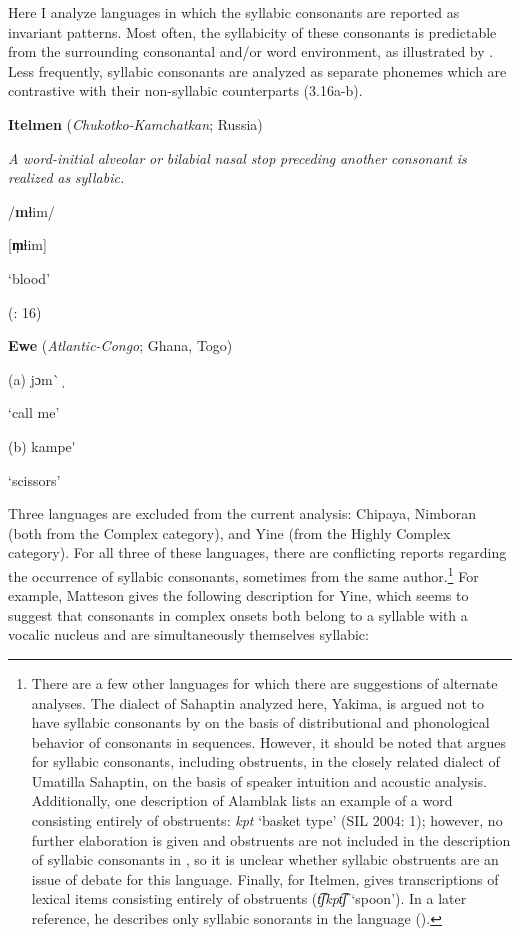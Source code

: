  Here I analyze languages in which the syllabic consonants are reported as invariant patterns. Most often, the syllabicity of these consonants is predictable from the surrounding consonantal and/or word environment, as illustrated by . Less frequently, syllabic consonants are analyzed as separate phonemes which are contrastive with their non-syllabic counterparts (3.16a-b).

\ea\label{ex:(3.15)}
  \textbf{Itelmen} (\textit{Chukotko-Kamchatkan}; Russia)

\textit{A} \textit{word-initial} \textit{alveolar} \textit{or} \textit{bilabial} \textit{nasal} \textit{stop} \textit{preceding} \textit{another} \textit{consonant} \textit{is} \textit{realized} \textit{as} \textit{syllabic.}

/\textbf{m}ɬim/

[\textbf{m̩}ɬim]

\glt ‘blood’

(\citealt{GeorgVolodin1999}: 16)
\z

\ea\label{ex:(3.16)}
  \textbf{Ewe} (\textit{Atlantic-Congo}; Ghana, Togo)

(a)   jɔm\`{} ̩

  ‘call me’

(b)  kampe\'{} 

  ‘scissors’

\citep[38]{Ameka1991}

\z

  Three languages are excluded from the current analysis: Chipaya, Nimboran (both from the Complex category), and Yine (from the Highly Complex category). For all three of these languages, there are conflicting reports regarding the occurrence of syllabic consonants, sometimes from the same author.\footnote{ \textrm{There are a few other languages for which there are suggestions of alternate analyses. The dialect of Sahaptin analyzed here, Yakima, is argued not to have syllabic consonants by \citet{HargusBeavert2006} on the basis of distributional and phonological behavior of consonants in sequences. However, it should be noted that \citet{Minthorn2005} argues for syllabic consonants, including obstruents, in the closely related dialect of Umatilla Sahaptin, on the basis of speaker intuition and acoustic analysis. Additionally, one description of Alamblak lists an example of a word consisting entirely of obstruents:} \textrm{\textit{kpt}} \textrm{‘basket type’ (SIL 2004: 1); however, no further elaboration is given and obstruents are not included in the description of syllabic consonants in \citet{Bruce1984}, so it is unclear whether syllabic obstruents are an issue of debate for this language. Finally, for Itelmen, \citet[42]{Volodin1976} gives transcriptions of lexical items consisting entirely of obstruents (}\textrm{\textit{t͡ʃkpt͡ʃ} }\textrm{‘spoon’). In a later reference, he describes only syllabic sonorants in the language (\citealt{GeorgVolodin1999}).}} For example, Matteson gives the following description for Yine, which seems to suggest that consonants in complex onsets both belong to a syllable with a vocalic nucleus and are simultaneously themselves syllabic:


